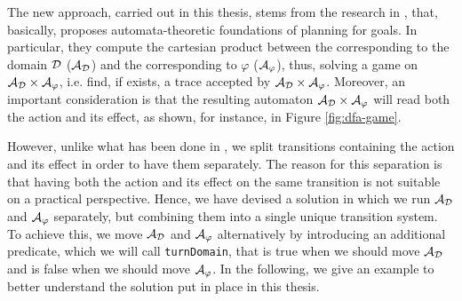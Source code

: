 The new approach, carried out in this thesis, stems from the research in \cite{de2018automata}, that, basically, proposes automata-theoretic foundations of \FOND planning for \LTLf goals. In particular, they compute the cartesian product between the \DFA corresponding to the domain $\mathcal{D}$ ($\mathcal{A}_{\mathcal{D}}$) and the \DFA corresponding to $\varphi$ ($\mathcal{A}_\varphi$), thus, solving a \DFA game on $\mathcal{A}_{\mathcal{D}} \times \mathcal{A}_\varphi$, i.e. find, if exists, a trace accepted by $\mathcal{A}_{\mathcal{D}} \times \mathcal{A}_\varphi$. Moreover, an important consideration is that the resulting automaton $\mathcal{A}_{\mathcal{D}} \times \mathcal{A}_\varphi$ will read both the action and its effect, as shown, for instance, in Figure \ref{fig:dfa-game}.

However, unlike what has been done in \cite{de2018automata}, we split transitions containing the action and its effect in order to have them separately. The reason for this separation is that having both the action and its effect on the same transition is not suitable on a practical perspective. Hence, we have devised a solution in which we run $\mathcal{A}_{\mathcal{D}}$ and $\mathcal{A}_\varphi$ separately, but combining them into a single unique transition system. To achieve this, we move $\mathcal{A}_{\mathcal{D}}$ and $\mathcal{A}_\varphi$ alternatively by introducing an additional predicate, which we will call \texttt{turnDomain}, that is true when we should move $\mathcal{A}_{\mathcal{D}}$ and is false when we should move $\mathcal{A}_\varphi$. In the following, we give an example to better understand the solution put in place in this thesis.

